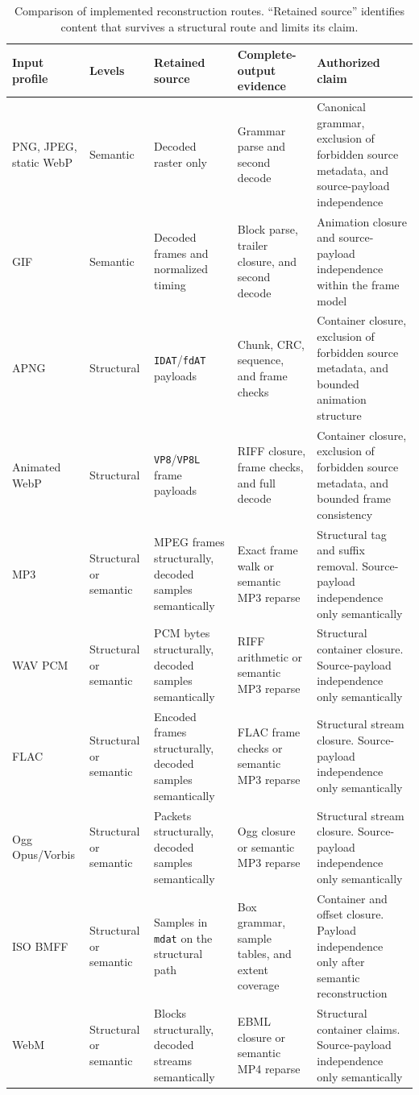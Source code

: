\begin{table}[t]
\centering
\caption{Comparison of implemented reconstruction routes. ``Retained source''
identifies content that survives a structural route and limits its claim.}
\label{tab:format-profile-comparison}
\scriptsize
\setlength{\tabcolsep}{3.1pt}
\begin{tabularx}{\textwidth}{L{0.15\textwidth}L{0.12\textwidth}L{0.19\textwidth}L{0.21\textwidth}Y}
\toprule
Input profile & Levels & Retained source & Complete-output evidence & Authorized claim \\
\midrule
PNG, JPEG, static WebP & Semantic & Decoded raster only & Grammar parse and second decode & Canonical grammar, exclusion of forbidden source metadata, and source-payload independence \\
GIF & Semantic & Decoded frames and normalized timing & Block parse, trailer closure, and second decode & Animation closure and source-payload independence within the frame model \\
APNG & Structural & \texttt{IDAT}/\texttt{fdAT} payloads & Chunk, CRC, sequence, and frame checks & Container closure, exclusion of forbidden source metadata, and bounded animation structure \\
Animated WebP & Structural & \texttt{VP8}/\texttt{VP8L} frame payloads & RIFF closure, frame checks, and full decode & Container closure, exclusion of forbidden source metadata, and bounded frame consistency \\
MP3 & Structural or semantic & MPEG frames structurally, decoded samples semantically & Exact frame walk or semantic MP3 reparse & Structural tag and suffix removal. Source-payload independence only semantically \\
WAV PCM & Structural or semantic & PCM bytes structurally, decoded samples semantically & RIFF arithmetic or semantic MP3 reparse & Structural container closure. Source-payload independence only semantically \\
FLAC & Structural or semantic & Encoded frames structurally, decoded samples semantically & FLAC frame checks or semantic MP3 reparse & Structural stream closure. Source-payload independence only semantically \\
Ogg Opus/Vorbis & Structural or semantic & Packets structurally, decoded samples semantically & Ogg closure or semantic MP3 reparse & Structural stream closure. Source-payload independence only semantically \\
ISO BMFF & Structural or semantic & Samples in \texttt{mdat} on the structural path & Box grammar, sample tables, and extent coverage & Container and offset closure. Payload independence only after semantic reconstruction \\
WebM & Structural or semantic & Blocks structurally, decoded streams semantically & EBML closure or semantic MP4 reparse & Structural container claims. Source-payload independence only semantically \\
\bottomrule
\end{tabularx}
\end{table}

